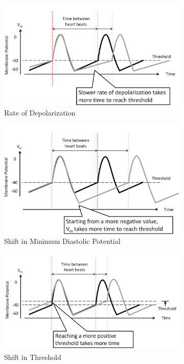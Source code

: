 \documentclass[11pt,fleqn]{book} %
\begin{document}
\begin{figure}[h!]
    \centering
    \begin{subfigure}{0.45\textwidth}
        \includegraphics[width=\textwidth]{Pictures/Screenshot 2024-04-04 004646.png}
        \caption{Rate of Depolarization}
    \end{subfigure}
    \hfill
    \begin{subfigure}{0.45\textwidth}
        \includegraphics[width=\textwidth]{Pictures/Screenshot 2024-04-04 004728.png}
        \caption{Shift in Minimum Diastolic Potential}
    \end{subfigure}
    \begin{subfigure}{0.45\textwidth}
        \includegraphics[width=\textwidth]{Pictures/Screenshot 2024-04-04 004744.png}
        \caption{Shift in Threshold}
    \end{subfigure}
    \caption{}
\end{figure}
\end{document}
